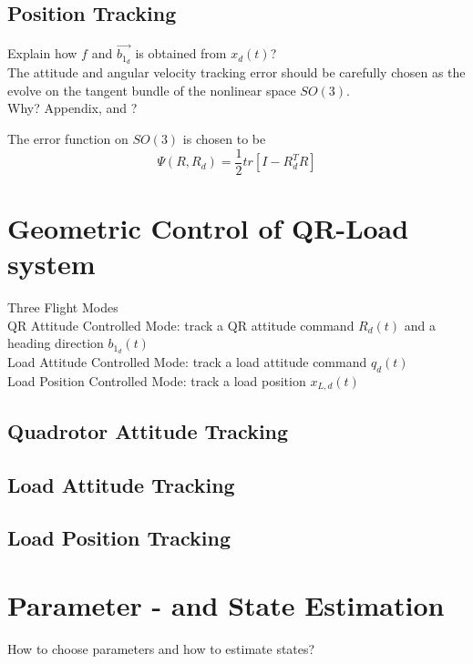 		\subsection{Position Tracking}
		
		
		Explain how $ f $ and $ \vec{b_{1_d}} $ is obtained from $ x_d(t) $?\\
		
		The attitude and angular velocity tracking error should be carefully chosen as the evolve on the tangent bundle of the nonlinear space $ SO(3) $. \cite{Lee2010}\\
		Why? Appendix\cite{Lee2010}, and \cite{Bullo2005}?
		
		The error function on $ SO(3) $ is chosen to be \cite{Lee2010}
		\begin{equation}\label{eq:errorfunc}
		\Psi(R,R_d)=\frac{1}{2}tr\left[I-R_d^TR\right]
		\end{equation}

\section{Geometric Control of QR-Load system}
Three Flight Modes\\
QR Attitude Controlled Mode: track a QR attitude command $ R_d(t) $ and a heading direction $ b_{1_d}(t) $ \\
Load Attitude Controlled Mode: track a load attitude command $ q_d(t) $ \\
Load Position Controlled Mode: track a load position $ x_{L,d}(t) $\\

		\subsection{Quadrotor Attitude Tracking}

		\subsection{Load Attitude Tracking}
		
		\subsection{Load Position Tracking}

\section{Parameter - and State Estimation}
How to choose parameters and how to estimate states?


